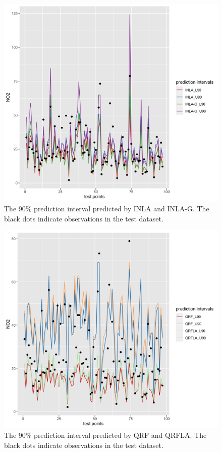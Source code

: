 \documentclass{article}
\begin{document}
\begin{figure}
\centering
\includegraphics[scale = 0.2]{fig/INLA_pred.png}

\caption{The 90\% prediction interval predicted by INLA and INLA-G. The black dots indicate observations in the test dataset.}
\label{inlapred}
\end{figure}

\begin{figure}
\centering
\includegraphics[scale = 0.2]{fig/qrf_qrfla.png}
\caption{The 90\% prediction interval predicted by QRF and QRFLA. The black dots indicate observations in the test dataset.}
\label{qrfrfla}
\end{figure}
\end{document}
